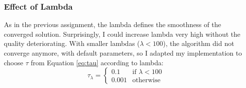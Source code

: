 \documentclass{paper}
\begin{document}
\subsubsection*{Effect of Lambda}
As in the previous assignment, the lambda defines the smoothness of the converged
solution. Surprisingly, I could increase lambda very high without the quality deteriorating.
With smaller lambdas ($ \lambda < 100 $), the algorithm did not converge anymore,
with default parameters, so I adapted my implementation to choose 
$\tau$ from Equation \ref{eq:tau} according to lambda:
\begin{equation}
	\tau_\lambda = 
	\begin{cases} 
		0.1 &\mbox{if } \lambda < 100 \\ 
		0.001 & \mbox{otherwise } 
	\end{cases}
\end{equation}
\end{document}
